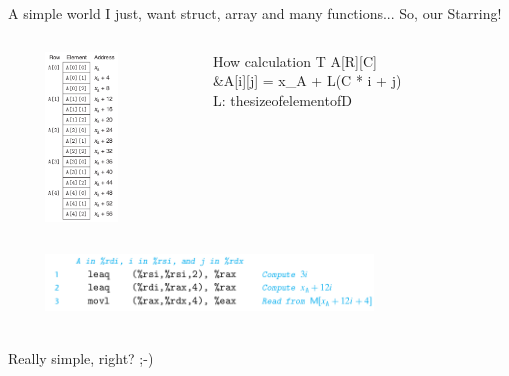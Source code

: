\documentclass[UKenglish]{beamer}
\begin{document}
  \begin{frame}{A simple world}
    I just, want struct, array and many functions... So, our Starring!
\begin{columns}[onlytextwidth]
    \begin{column}{0.45\textwidth}
          \begin{minipage}[c][0.56\textheight][c]{\linewidth} 
          \includegraphics[width = 0.8\textwidth, height=4.5cm]{array.png}
          \end{minipage}
    \end{column}
    \begin{column}{0.5\textwidth}
      \begin{minipage}[c][0.55\textheight][c]{1\linewidth} 
        \begin{block}{How calculation}
          T A[R][C]\\
          \&A[i][j] = x_A + L(C * i + j)\\
          L: the\enspace size\enspace of\enspace element\enspace of\enspace D
         \end{block}
         \end{minipage}
       \end{column}
     \end{columns}
     \includegraphics[width = 0.8\textwidth, height=1.5cm]{array_assembly.png}
     \begin{center}
         \\\Large  Really simple, right? ;-)
     \end{center}
   \end{frame}
\end{document}
